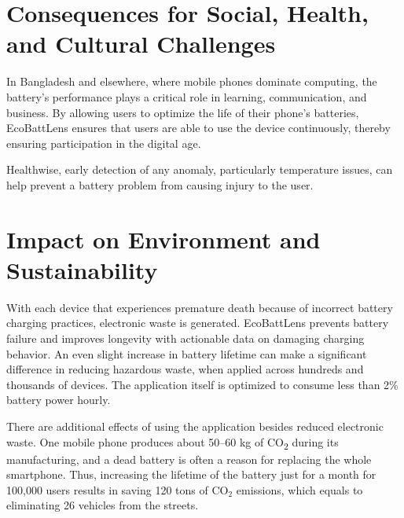 \documentclass[12pt,a4paper]{report}
\begin{document}
\section{Consequences for Social, Health, and Cultural Challenges}

In Bangladesh and elsewhere, where mobile phones dominate computing, the battery’s
performance plays a critical role in learning, communication, and business. By allowing
users to optimize the life of their phone’s batteries, EcoBattLens ensures that users
are able to use the device continuously, thereby ensuring participation in the digital age.

Healthwise, early detection of any anomaly, particularly temperature issues, can help
prevent a battery problem from causing injury to the user.

\section{Impact on Environment and Sustainability}
With each device that experiences premature death because of incorrect battery charging practices, electronic waste is generated.
EcoBattLens prevents battery failure and improves longevity with actionable data on
damaging charging behavior. An even slight increase in battery lifetime can make a significant
difference in reducing hazardous waste, when applied across hundreds and thousands of devices.
The application itself is optimized to consume less than 2\% battery power hourly.

There are additional effects of using the application besides reduced electronic waste.
One mobile phone produces about 50–60 kg of CO\textsubscript{2} during its manufacturing,
and a dead battery is often a reason for replacing the whole smartphone. Thus, increasing
the lifetime of the battery just for a month for 100,000 users results in saving 120 tons of CO$_2$ emissions, which equals to eliminating 26 vehicles from the streets.
\end{document}
